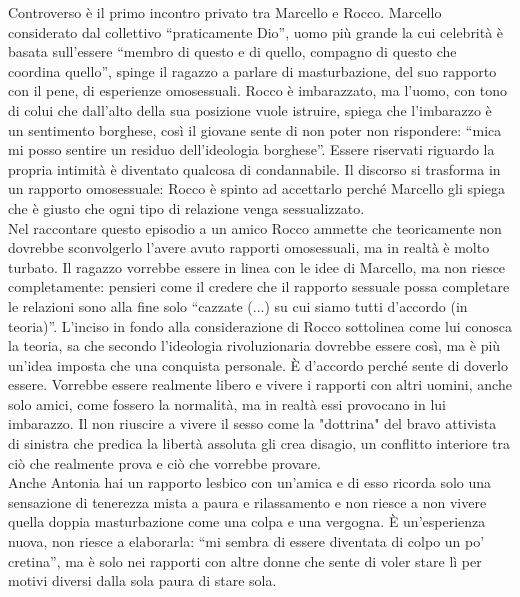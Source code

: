Controverso è il primo incontro privato tra Marcello e Rocco.
Marcello considerato dal collettivo \enquote{praticamente Dio}, uomo più grande la cui celebrità è basata sull'essere \enquote{membro di questo e di quello, compagno di questo che coordina quello}, spinge il ragazzo a parlare di masturbazione,  del suo rapporto con il pene, di esperienze omosessuali.
Rocco è imbarazzato, ma l'uomo, con tono di colui che dall'alto della sua posizione vuole istruire, spiega che l'imbarazzo è un sentimento borghese, così il giovane sente di non poter non rispondere: \enquote{mica mi posso sentire un residuo dell'ideologia borghese}.
Essere riservati riguardo la propria intimità è diventato qualcosa di condannabile.
Il discorso si trasforma in un rapporto omosessuale: Rocco è spinto ad accettarlo perché Marcello gli spiega che è giusto che ogni tipo di relazione venga sessualizzato.
\\Nel raccontare questo episodio a un amico Rocco ammette che teoricamente non dovrebbe sconvolgerlo l'avere avuto rapporti omosessuali, ma in realtà è molto turbato.
Il ragazzo vorrebbe essere in linea con le idee di Marcello, ma non riesce completamente: pensieri come il credere che il rapporto sessuale possa completare le relazioni sono alla fine solo \enquote{cazzate (...) su cui siamo tutti d'accordo (in teoria)}.
L'inciso in fondo alla considerazione di Rocco sottolinea come lui conosca la teoria, sa che secondo l'ideologia rivoluzionaria dovrebbe essere così, ma è più un'idea imposta che una conquista personale.
È d'accordo perché sente di doverlo essere. 
Vorrebbe essere realmente libero e vivere i rapporti con altri uomini, anche solo amici, come fossero la normalità, ma in realtà essi provocano in lui imbarazzo.
Il non riuscire a vivere il sesso come la "dottrina" del bravo attivista di sinistra che predica la libertà assoluta  gli crea disagio, un conflitto interiore tra ciò che realmente prova e ciò che vorrebbe provare.
\\Anche Antonia hai un rapporto lesbico con un'amica e di esso ricorda solo una sensazione di tenerezza mista a paura e rilassamento e non riesce a non vivere quella doppia masturbazione come una colpa e una vergogna.
È un'esperienza nuova, non riesce a elaborarla: \enquote{mi sembra di essere diventata di colpo un po' cretina}, ma è solo nei rapporti con altre donne che sente di voler stare lì per motivi diversi dalla sola paura di stare sola.

